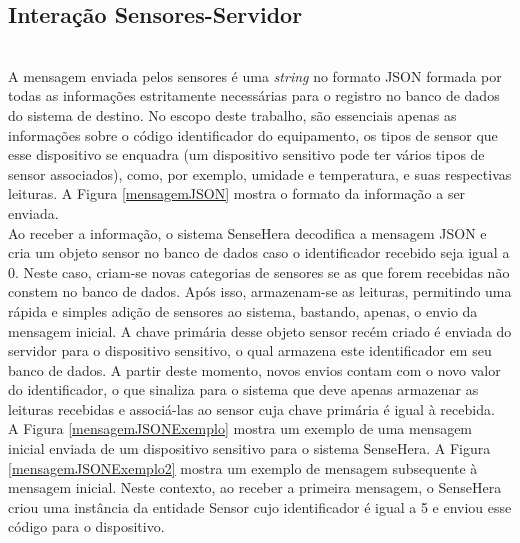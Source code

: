 \subsection{Interação Sensores-Servidor}

\\\null \quad A mensagem enviada pelos sensores é uma \textit{string} no formato JSON formada por todas as informações estritamente necessárias para o registro no banco de dados do sistema de destino.
No escopo deste trabalho, são essenciais apenas as informações sobre o código identificador do equipamento, os tipos de sensor que esse dispositivo se enquadra (um dispositivo sensitivo pode ter vários tipos de sensor associados), como, por exemplo, umidade e temperatura, e suas respectivas leituras. A Figura \ref{mensagemJSON} mostra o formato da informação a ser enviada.
\\\null \quad Ao receber a informação, o sistema SenseHera decodifica a mensagem JSON e cria um objeto sensor no banco de dados caso o identificador recebido seja igual a 0. Neste caso, criam-se novas categorias de sensores se as que forem recebidas não constem no banco de dados. Após isso, armazenam-se as leituras, permitindo uma rápida e simples adição de sensores ao sistema, bastando, apenas, o envio da mensagem inicial. A chave primária desse objeto sensor recém criado é enviada do servidor para o dispositivo sensitivo, o qual armazena este identificador em seu banco de dados. A partir deste momento, novos envios contam com o novo valor do identificador, o que sinaliza para o sistema que deve apenas armazenar as leituras recebidas e associá-las ao sensor cuja chave primária é igual à recebida.
\\\null\quad A Figura \ref{mensagemJSONExemplo} mostra um exemplo de uma mensagem inicial enviada de um dispositivo sensitivo para o sistema SenseHera. A Figura \ref{mensagemJSONExemplo2} mostra um exemplo de mensagem subsequente à mensagem inicial. Neste contexto, ao receber a primeira mensagem, o SenseHera criou uma instância da entidade Sensor cujo identificador é igual a 5 e enviou esse código para o dispositivo.
\\\\\\

\\\\\\
